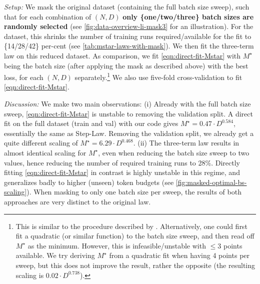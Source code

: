 \documentclass[12pt,a4paper,twoside]{article}
\begin{document}
\textit{Setup:} We mask the original dataset (containing the full batch size sweep), such that for each combination of $(N,D)$ \textbf{only \{one/two/three\} batch sizes are randomly selected} (see \cref{fig:data-overview-li-mask3} for an illustration). For the \li{} dataset, this shrinks the number of training runs required/available for the fit to \{14/28/42\} per-cent (see \cref{tab:mstar-laws-with-mask}). We then fit the three-term law on this reduced dataset.
As comparison, we fit \eqref{eqn:direct-fit-Mstar} with $M^\star$ being the batch size (after applying the mask as described above) with the best loss, for each $(N,D)$ separately.\footnote{
    This is similar to the procedure described by \citet{Li2025}. Alternatively, one could first fit a quadratic (or similar function) to the batch size sweep, and then read off $M^\star$ as the minimum. However, this is infeasible/unstable with $\leq 3$ points available. We try deriving $M^\star$ from a quadratic fit when having 4 points per sweep, but this does not improve the result, rather the opposite (the resulting scaling is $0.02\cdot D^{0.738}$).
} We also use five-fold cross-validation to fit \eqref{eqn:direct-fit-Mstar}.

\textit{Discussion:}
We make two main observations: (i) Already with the full batch size sweep, \eqref{eqn:direct-fit-Mstar} is unstable to removing the validation split. A direct fit on the full dataset (train and val) with our code gives $M^\star = 0.47 \cdot D^{0.584}$, essentially the same as Step-Law. Removing the validation split, we already get a quite different scaling of $M^\star = 6.29 \cdot D^{0.468}$. (ii) The three-term law results in almost identical scaling for $M^\star$, even when reducing the batch size sweep to two values, hence reducing the number of required training runs to 28\%. Directly fitting \eqref{eqn:direct-fit-Mstar} in contrast is highly unstable in this regime, and generalizes badly to higher (unseen) token budgets (see \cref{fig:masked-optimal-bs-scaling}). When masking to only one batch size per sweep, the results of both approaches are very distinct to the original law. 
\end{document}
